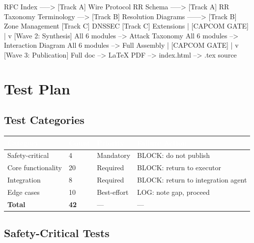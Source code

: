 \documentclass[11pt,letterpaper]{article}
\newcommand{\tableheader}[1]{\textbf{\sffamily\textcolor{white}{#1}}}
\begin{document}
\begin{asciibox}
   RFC Index -----> [Track A] Wire Protocol
   RR Schema -----> [Track A] RR Taxonomy
   Terminology ---> [Track B] Resolution
   Diagrams ------> [Track B] Zone Management
                    [Track C] DNSSEC
                    [Track C] Extensions
                          |
         [CAPCOM GATE]    |
                          v
               [Wave 2: Synthesis]
               All 6 modules --> Attack Taxonomy
               All 6 modules --> Interaction Diagram
               All 6 modules --> Full Assembly
                          |
         [CAPCOM GATE]    |
                          v
               [Wave 3: Publication]
               Full doc --> LaTeX PDF
                        --> index.html
                        --> .tex source
\end{asciibox}

\section{Test Plan}

\subsection{Test Categories}

\begin{center}
\begin{tabularx}{\textwidth}{L{3cm}C{1.5cm}C{2cm}X}
\toprule
{}
\tableheader{Category} & \tableheader{Count} & \tableheader{Priority} & \tableheader{Failure Action} \\
\midrule
Safety-critical & 4 & Mandatory & BLOCK: do not publish \\
Core functionality & 20 & Required & BLOCK: return to executor \\
Integration & 8 & Required & BLOCK: return to integration agent \\
Edge cases & 10 & Best-effort & LOG: note gap, proceed \\
\midrule
\textbf{Total} & \textbf{42} & --- & --- \\
\bottomrule
\end{tabularx}
\end{center}

\subsection{Safety-Critical Tests}
\end{document}
